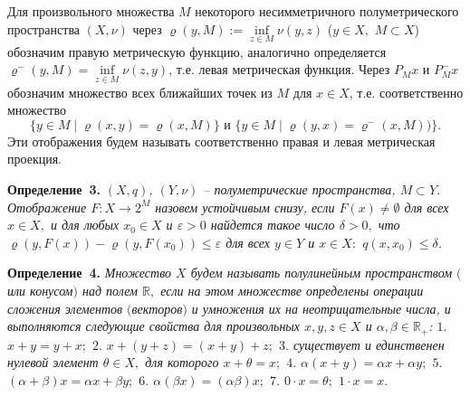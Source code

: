 Для произвольного множества $M$   некоторого    несимметричного   полуметрического пространства $(X,\nu) $ через $\varrho(y,M):=\inf\limits_{z\in M}\nu(y,z)$ ($y\in X,$ $M\subset X$) обозначим правую метрическую функцию, аналогично определяется   $\varrho^-(y,M)=\inf\limits_{z\in M}\nu(z,y)$, т.е. левая метрическая функция.
  Через $P_Mx$ и $P_M^-x$ обозначим множество всех ближайших точек из $M$ для $x\in X$, т.е. соответственно множество $$\{y\in M\mid \varrho(x,y)=\varrho(x,M)\} \mbox{ и }\{y\in M\mid \varrho(y,x)=\varrho^-(x,M))\}.$$ Эти отображения будем называть соответственно правая и левая метрическая проекция.

\textbf{Определение~3.} {\it
 $(X,q)$, $(Y,\nu) $ -- полуметрические
пространства, $M\subset Y$. Отображение $F:X\rightarrow 2^M$
назовем устойчивым снизу, если $F(x)\neq \emptyset$ для всех $x\in
X,$  и для любых $x_0\in X$  и $\varepsilon>0$ найдется такое
число $\delta>0,$ что
$\varrho(y,F(x))-\varrho(y,F(x_0))\leqslant\varepsilon$ для всех
$y\in Y$ и $x\in X:$ $q(x,x_0)\leqslant\delta$.}

\textbf{Определение~4.} {\it
Множество $X$ будем называть полулинейным пространством $($или конусом$)$ над полем $\mathbb{R},$ если на этом множестве определены операции сложения элементов $($векторов$)$ и умножения их на неотрицательные числа, и выполняются следующие свойства для произвольных $x,y,z\in X$ и $\alpha,\beta\in \mathbb{R}_+$:
$1.$ $x+y=y+x;$
$2.$ $x+(y+z)=(x+y)+z;$
$3.$ существует и единственен нулевой элемент $\theta\in X,$ для которого $x+\theta=x;$
$4.$ $\alpha(x+y)=\alpha x+\alpha y;$
$5.$ $(\alpha+\beta)x=\alpha x+\beta y;$
$6.$ $\alpha(\beta x)=(\alpha\beta)x;$
$7.$ $0\cdot x=\theta;$ $1\cdot x=x.$ }


